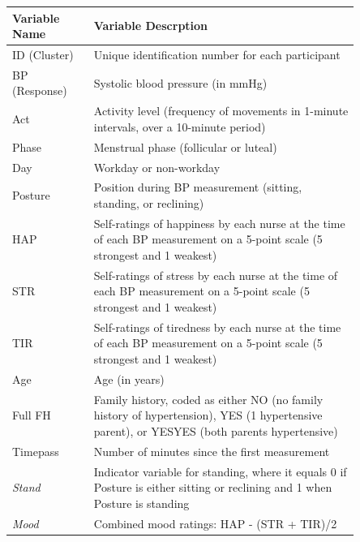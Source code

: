 \documentclass[12pt,twoside,letterpaper]{article}
\theoremstyle{definition}
\theoremstyle{definition}
\begin{document}
\begin{table} 
    \centering\begin{tabular}{|p{0.2\linewidth} | p{0.65\linewidth}|}
        \hline
        Variable Name & Variable Descrption \\
        \hline\hline
        ID (Cluster) & Unique identification number for each participant \\
        \hline
        BP (Response) & Systolic blood pressure (in mmHg) \\
        \hline
        \textcolor[RGB]{208, 2, 27}{Act} & Activity level (frequency of movements in 1-minute intervals, over a 10-minute period) \\
        \hline
        \textcolor[RGB]{74, 144, 226}{Phase} & Menstrual phase (follicular or luteal) \\
        \hline
        \textcolor[RGB]{74, 144, 226}{Day} & Workday or non-workday \\
        \hline
        \textcolor[RGB]{208, 2, 27}{Posture} & Position during BP measurement (sitting, standing, or reclining) \\
        \hline
        \textcolor[RGB]{208, 2, 27}{HAP} & Self-ratings of happiness by each nurse at the time of each BP measurement on a 5-point scale (5 strongest and 1 weakest) \\
        \hline
        \textcolor[RGB]{208, 2, 27}{STR} & Self-ratings of stress by each nurse at the time of each BP measurement on a 5-point scale (5 strongest and 1 weakest) \\
        \hline
        \textcolor[RGB]{208, 2, 27}{TIR} & Self-ratings of tiredness by each nurse at the time of each BP measurement on a 5-point scale (5 strongest and 1 weakest) \\
        \hline
        \textcolor[RGB]{74, 144, 226}{Age} & Age (in years) \\
        \hline
        \textcolor[RGB]{74, 144, 226}{Full FH} & Family history, coded as either NO (no family history of  hypertension), YES (1 hypertensive parent), or YESYES (both parents hypertensive) \\
        \textcolor[RGB]{208, 2, 27}{Timepass} & Number of minutes since the first measurement \\
        \hline
        \hline\hline
        \emph{\textcolor[RGB]{208, 2, 27}{Stand}} & Indicator variable for standing, where it equals 0 if Posture is either sitting or reclining and 1 when Posture is standing \\
        \hline
        \emph{\textcolor[RGB]{208, 2, 27}{Mood}} & Combined mood ratings: HAP - (STR + TIR)/2 \\

\end{tabular}
\end{table}
\end{document}
